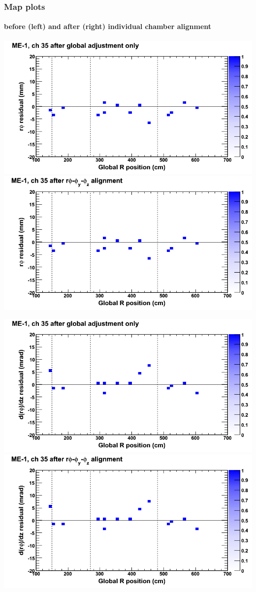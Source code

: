 \documentclass[compress]{beamer}
\begin{document}
\begin{frame}
\frametitle{Map plots}
\framesubtitle{before (left) and after (right) individual chamber alignment}
\includegraphics[width=0.5\linewidth]{ringmapplots_3dof/before_CSCvsr_mem1ch35_x.png} \includegraphics[width=0.5\linewidth]{ringmapplots_3dof/after_CSCvsr_mem1ch35_x.png}

\includegraphics[width=0.5\linewidth]{ringmapplots_3dof/before_CSCvsr_mem1ch35_dxdz.png} \includegraphics[width=0.5\linewidth]{ringmapplots_3dof/after_CSCvsr_mem1ch35_dxdz.png}
\end{frame}
\end{document}
